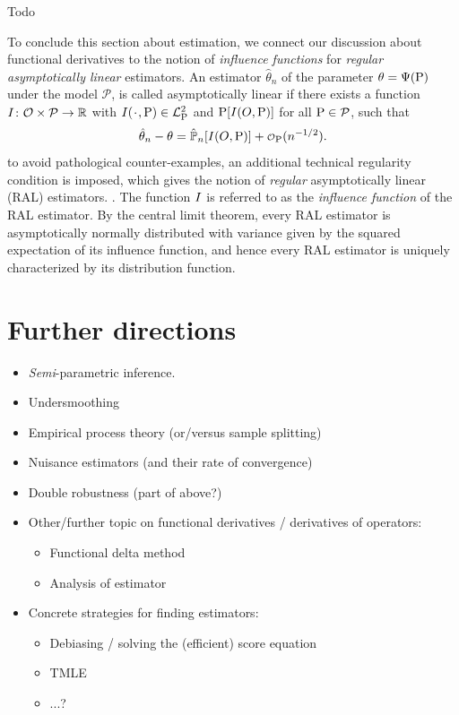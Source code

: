 \documentclass[a4,danish]{article}
\begin{document}
\begin{example}
  Todo
\end{example}

To conclude this section about estimation, we connect our discussion about functional derivatives to
the notion of \textit{influence functions} for \textit{regular asymptotically linear} estimators. An
estimator $\hat{\theta}_n$ of the parameter $\theta = \TT(\P)$ under the model $\mathcal{P}$, is
called asymptotically linear if there exists a function
$\ic\colon \mathcal{O} \times \mathcal{P} \rightarrow \R$ with $\ic(\blank, \P) \in \lp$ and
$\P[\ic(O, \P)]$ for all $\P \in \mathcal{P}$, such that
\begin{equation*}
  \hat{\theta}_n - \theta = \empmeas[\ic(O, \P)] + \smallO_{\P}(n^{-1/2}).
\end{equation*}
to avoid pathological counter-examples, an additional technical regularity condition is imposed,
which gives the notion of \textit{regular} asymptotically linear (RAL) estimators.
. The function $\ic$ is referred to as the \textit{influence function} of
the RAL estimator. By the central limit theorem, every RAL estimator is asymptotically normally
distributed with variance given by the squared expectation of its influence function, and hence
every RAL estimator is uniquely characterized by its distribution function. 

 
\section{Further directions}
\label{sec:further-directions}

\begin{itemize}
\item \textit{Semi}-parametric inference.  
\item Undersmoothing
\item Empirical process theory (or/versus sample splitting)
\item Nuisance estimators (and their rate of convergence)
\item Double robustness (part of above?)
\item Other/further topic on functional derivatives / derivatives of operators:
  \begin{itemize}
  \item Functional delta method 
  \item Analysis of estimator
  \end{itemize}
\item Concrete strategies for finding estimators:
  \begin{itemize}
  \item Debiasing / solving the (efficient) score equation
  \item TMLE
  \item ...?
  \end{itemize}
\end{itemize}


\end{document}
